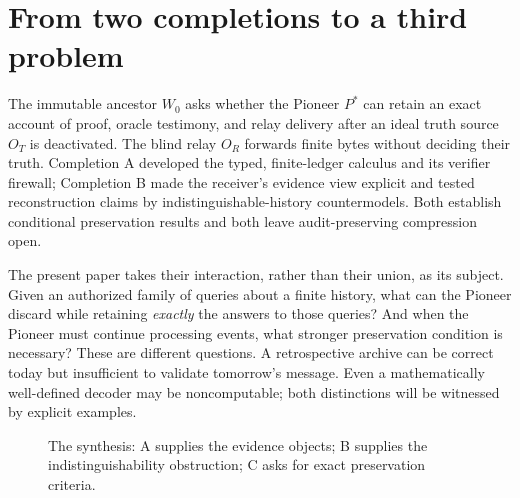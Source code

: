 \documentclass[11pt,letterpaper]{article}
\theoremstyle{definition}
\begin{document}
\section{From two completions to a third problem}
The immutable ancestor $W_0$ asks whether the Pioneer $P^*$ can retain an exact account of proof, oracle testimony, and relay delivery after an ideal truth source $O_T$ is deactivated. The blind relay $O_R$ forwards finite bytes without deciding their truth. Completion A developed the typed, finite-ledger calculus and its verifier firewall; Completion B made the receiver's evidence view explicit and tested reconstruction claims by indistinguishable-history countermodels. Both establish conditional preservation results and both leave audit-preserving compression open.

The present paper takes their interaction, rather than their union, as its subject. Given an authorized family of queries about a finite history, what can the Pioneer discard while retaining \emph{exactly} the answers to those queries? And when the Pioneer must continue processing events, what stronger preservation condition is necessary? These are different questions. A retrospective archive can be correct today but insufficient to validate tomorrow's message. Even a mathematically well-defined decoder may be noncomputable; both distinctions will be witnessed by explicit examples.

\begin{figure}[htbp]\centering
{}
\caption{The synthesis: A supplies the evidence objects; B supplies the indistinguishability obstruction; C asks for exact preservation criteria.}
\label{fig:synergy}
\end{figure}
\end{document}
